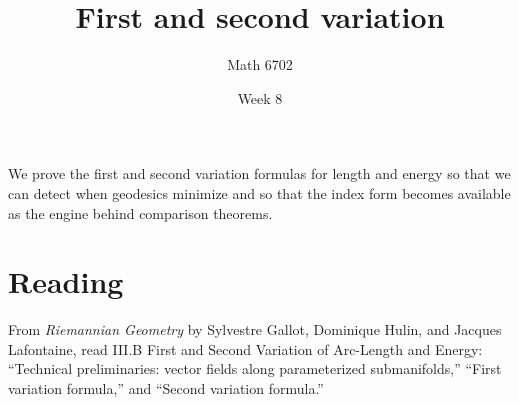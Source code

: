 \documentclass{article}
\title{First and second variation}
\author{Math 6702}
\date{Week 8}
\begin{document}
\maketitle

We prove the first and second variation formulas for length and energy so that we can detect when geodesics minimize and so that the index form becomes available as the engine behind comparison theorems.

\section*{Reading}
From \textit{Riemannian Geometry} by Sylvestre Gallot, Dominique Hulin, and Jacques Lafontaine, read \textsection III.B First and Second Variation of Arc-Length and Energy: ``Technical preliminaries: vector fields along parameterized submanifolds,'' ``First variation formula,'' and ``Second variation formula.''
\end{document}
